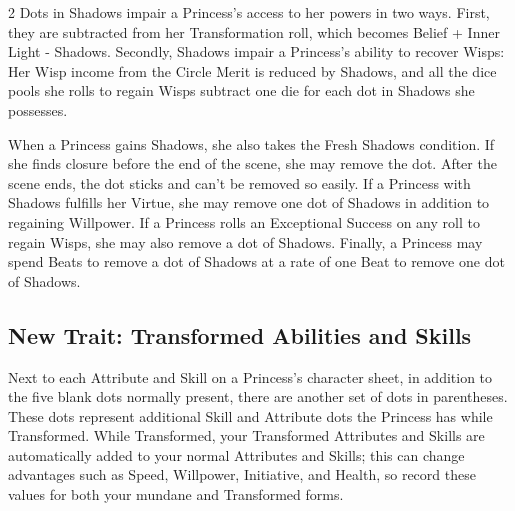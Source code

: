 \begin{multicols}{2}
Dots in Shadows impair a Princess's access to her powers in two ways. First, they are subtracted from her Transformation roll, which becomes Belief + Inner Light - Shadows. Secondly, Shadows impair a Princess's ability to recover Wisps: Her Wisp income from the Circle Merit is reduced by Shadows, and all the dice pools she rolls to regain Wisps subtract one die for each dot in Shadows she possesses.

When a Princess gains Shadows, she also takes the Fresh Shadows condition. If she finds closure before the end of the scene, she may remove the dot. After the scene ends, the dot sticks and can't be removed so easily. If a Princess with Shadows fulfills her Virtue, she may remove one dot of Shadows in addition to regaining Willpower. If a Princess rolls an Exceptional Success on any roll to regain Wisps, she may also remove a dot of Shadows. Finally, a Princess may spend Beats to remove a dot of Shadows at a rate of one Beat to remove one dot of Shadows.  




\subsection*{New Trait: Transformed Abilities and Skills}
\label{subsec:TransformedAbilitiesAndSkills} 
Next to each Attribute and Skill on a Princess's character sheet, in addition to the five blank dots normally present, there are another set of dots in parentheses. These dots represent additional Skill and Attribute dots the Princess has while Transformed. While Transformed, your Transformed Attributes and Skills are automatically added to your normal Attributes and Skills; this can change advantages such as Speed, Willpower, Initiative, and Health, so record these values for both your mundane and Transformed forms. 


\end{multicols}
